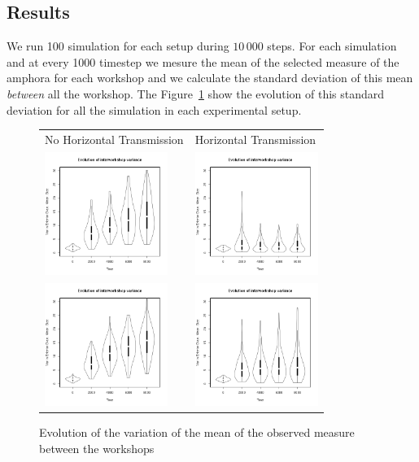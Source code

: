 \documentclass[a4paper]{article}
\begin{document}
\subsection{Results}
We run 100 simulation for each setup during $10\,000$ steps. For each simulation and at every 1000 timestep we mesure the mean of the selected measure of the amphora for each workshop and we calculate the standard deviation of this mean \emph{between} all the workshop. The Figure~\ref{fig:resmod} show the evolution of  this standard deviation for all the simulation in each experimental setup.
    \begin{figure}[h!]
    \centering
	\begin{tabular}{m{4cm}m{4cm}}
	    {\tiny \hspace{.4cm}No Horizontal Transmission} & {\centering\tiny Horizontal Transmission }\\
	    \includegraphics[height=4cm]{images/lineNC.png}
	    &
	    \includegraphics[height=4cm]{images/lineC.png}\\
	    \includegraphics[height=4cm]{images/cubeNC.png}
	    &
	    \includegraphics[height=4cm]{images/cubeC.png}\\
	\end{tabular}
	\caption{Evolution of the variation of the mean of the observed measure between the workshops}
	\label{fig:resmod}
    \end{figure}
\end{document}
